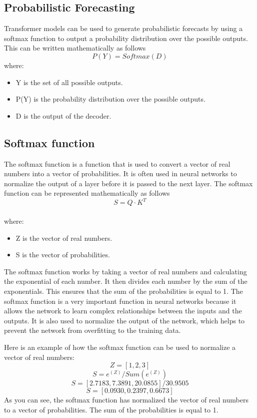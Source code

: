 \documentclass{article}
\begin{document}
\subsection{Probabilistic Forecasting}
Transformer models can be used to generate probabilistic forecasts by using a softmax function to output a probability distribution over the possible outputs. This can be written mathematically as follows \\
\[P(Y) = Softmax(D) \] 
where:
\begin{itemize}
    \item Y is the set of all possible outputs.
    \item P(Y) is the probability distribution over the possible outputs.
    \item D is the output of the decoder.
\end{itemize}

\subsection{Softmax function}
The softmax function is a function that is used to convert a vector of real numbers into a vector of probabilities. It is often used in neural networks to normalize the output of a layer before it is passed to the next layer.
The softmax function can be represented mathematically as follows \\

\[ S = Q \cdot K^T \] \\ 
where:
\begin{itemize}
    \item Z is the vector of real numbers.
    \item S is the vector of probabilities. 
\end{itemize}

The softmax function works by taking a vector of real numbers and calculating the exponential of each number. It then divides each number by the sum of the exponentials. This ensures that the sum of the probabilities is equal to 1.
The softmax function is a very important function in neural networks because it allows the network to learn complex relationships between the inputs and the outputs. It is also used to normalize the output of the network, which helps to prevent the network from overfitting to the training data.

Here is an example of how the softmax function can be used to normalize a vector of real numbers:
\[ Z = [1, 2, 3] \]
\[S = e^(Z)/Sum(e^(Z)) \]
\[S = [2.7183, 7.3891, 20.0855]/30.9505\]
\[S = [0.0930, 0.2397, 0.6673]\]
As you can see, the softmax function has normalized the vector of real numbers to a vector of probabilities. The sum of the probabilities is equal to 1.
\end{document}
